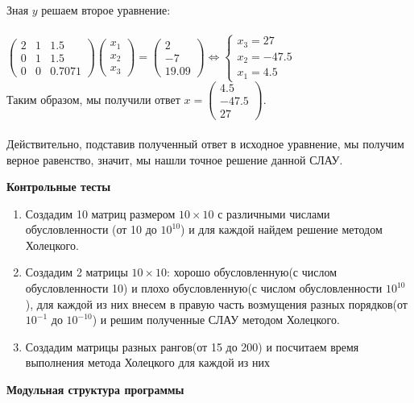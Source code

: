 \documentclass{article}
\begin{document}
	Зная $y$ решаем второе уравнение:\\
	\\
	$\left(
	\begin{array}{ccc}
		2 & 1 & 1.5\\
		0 & 1 & 1.5\\
		0 & 0 & 0.7071
	\end{array}
	\right)
	\left(
	\begin{array}{c}
		x_1\\
		x_2\\
		x_3
	\end{array}
	\right) = 
	\left(
	\begin{array}{c}
		2\\
		-7\\
		19.09
	\end{array}
	\right) \Leftrightarrow 
	\left\{
	\begin{array}{c}
		x_3 = 27\\
		x_2 = -47.5\\
		x_1 = 4.5
	\end{array}
	\right.$\\
	Таким образом, мы получили ответ $x = 
	\left(
	\begin{array}{c}
		4.5\\
		-47.5\\
		27
	\end{array}
	\right)$.\\
	\\
	Действительно, подставив полученный ответ в исходное уравнение, мы получим верное равенство, значит, мы нашли точное решение данной СЛАУ.
	\begin{center} \textbf{Контрольные тесты}\end{center}
	\begin{enumerate}
		\item Создадим 10 матриц размером $10\times10$ с различными числами обусловленности (от 10 до $10^{10}$) и для каждой найдем решение методом Холецкого.
		\item Создадим 2 матрицы $10\times10$: хорошо обусловленную(с числом обусловленности 10) и плохо обусловленную(с числом обусловленности $10^{10}$), для каждой из них внесем в правую часть возмущения разных порядков(от $10^{-1}$ до $10^{-10}$) и решим полученные СЛАУ методом Холецкого.
		\item Создадим матрицы разных рангов(от 15 до 200) и посчитаем время выполнения метода Холецкого для каждой из них
	\end{enumerate}
	\newpage
	\begin{center} \textbf{Модульная структура программы}\end{center}
\end{document}
